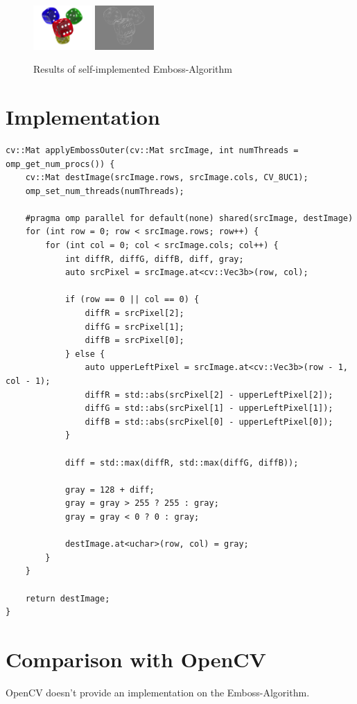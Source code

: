 \begin{figure}[H]
    \centering

    \includegraphics[width=0.20\textwidth]{images/dice.png}
    \includegraphics[width=0.20\textwidth]{images/own-emboss.png}
    
    \caption{Results of self-implemented Emboss-Algorithm}
    \label{fig:emboss}
\end{figure}

\section{Implementation}

\begin{listing}[H]
    \begin{verbatim}
cv::Mat applyEmbossOuter(cv::Mat srcImage, int numThreads = omp_get_num_procs()) {
    cv::Mat destImage(srcImage.rows, srcImage.cols, CV_8UC1);
    omp_set_num_threads(numThreads);

    #pragma omp parallel for default(none) shared(srcImage, destImage)
    for (int row = 0; row < srcImage.rows; row++) {
        for (int col = 0; col < srcImage.cols; col++) {
            int diffR, diffG, diffB, diff, gray;
            auto srcPixel = srcImage.at<cv::Vec3b>(row, col);

            if (row == 0 || col == 0) {
                diffR = srcPixel[2];
                diffG = srcPixel[1];
                diffB = srcPixel[0];
            } else {
                auto upperLeftPixel = srcImage.at<cv::Vec3b>(row - 1, col - 1);
                diffR = std::abs(srcPixel[2] - upperLeftPixel[2]);
                diffG = std::abs(srcPixel[1] - upperLeftPixel[1]);
                diffB = std::abs(srcPixel[0] - upperLeftPixel[0]);
            }

            diff = std::max(diffR, std::max(diffG, diffB));

            gray = 128 + diff;
            gray = gray > 255 ? 255 : gray;
            gray = gray < 0 ? 0 : gray;

            destImage.at<uchar>(row, col) = gray;
        }
    }

    return destImage;
}
    \end{verbatim}
    \label{listing:emboss}
\end{listing}

\section{Comparison with OpenCV}

OpenCV doesn't provide an implementation on the Emboss-Algorithm.